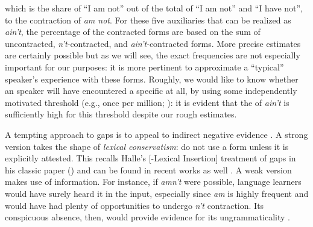 \documentclass[output=paper,
modfonts
]{LSP/langsci}
\begin{document}
which is the share of ``I am not'' out of the total of ``I am not''
and ``I have not'', to the
contraction of \textit{am not}.
For these five auxiliaries that can be realized as \textit{ain't}, the
percentage of the contracted  forms are based on the sum of
uncontracted, \textit{n't}-contracted, and 
\textit{ain't}-contracted forms. More precise  estimates are
certainly possible but as  we will see, the exact frequencies are not
especially important for our 
purposes: it is more pertinent to approximate a ``typical'' 
speaker's experience with these forms. Roughly, we would like to know
whether an  speaker will have encountered a specific
 at all, by using some independently motivated
 threshold (e.g., once per million; \citealt{Nagy1984}): it is evident
that the  of \textit{ain't} is sufficiently high  for this
threshold  despite our rough estimates. 


A tempting approach to gaps is to appeal to indirect negative evidence
\citep{LGB, Pinker1989}. A strong version takes the shape of \textit{lexical conservatism}: do not use a form unless it is explicitly
attested. This recalls Halle's [-Lexical Insertion] treatment of gaps 
in his classic paper (\citeyear{Halle1973a}) and can be found in recent
works as well \citep[e.g.,][]{Pertsova2005, Steriade1997, Rice2005b, Wolf2009}. A
weak version makes use of  information. For instance, if \textit{amn't} were  possible, language learners would have surely 
heard it in the input, especially since \textit{am} is highly
frequent and would have had plenty of opportunities to undergo \textit{n't} contraction. Its  conspicuous absence, then, would  provide
evidence for its 
ungrammaticality \citep[e.g.,][]{Daland2007, Sims2006, Baerman2008,
  Albright2009b}. 
\end{document}

